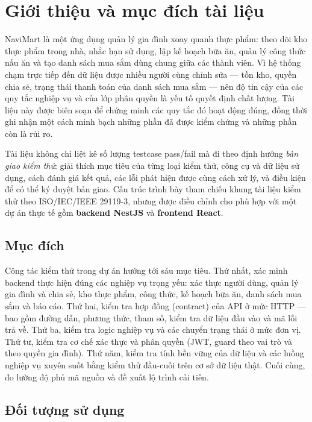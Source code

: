 \documentclass[12pt,a4paper]{article}
\begin{document}
\tableofcontents
\newpage

\section{Giới thiệu và mục đích tài liệu}

NaviMart là một ứng dụng quản lý gia đình xoay quanh thực phẩm: theo dõi kho thực phẩm trong nhà, nhắc hạn
sử dụng, lập kế hoạch bữa ăn, quản lý công thức nấu ăn và tạo danh sách mua sắm dùng chung giữa các thành
viên. Vì hệ thống chạm trực tiếp đến dữ liệu được nhiều người cùng chỉnh sửa --- tồn kho, quyền chia sẻ,
trạng thái thanh toán của danh sách mua sắm --- nên độ tin cậy của các quy tắc nghiệp vụ và của lớp phân
quyền là yếu tố quyết định chất lượng. Tài liệu này được biên soạn để chứng minh các quy tắc đó hoạt động
đúng, đồng thời ghi nhận một cách minh bạch những phần đã được kiểm chứng và những phần còn là rủi ro.

Tài liệu không chỉ liệt kê số lượng testcase pass/fail mà đi theo định hướng \emph{bàn giao kiểm thử}: giải
thích mục tiêu của từng loại kiểm thử, công cụ và dữ liệu sử dụng, cách đánh giá kết quả, các lỗi phát hiện
được cùng cách xử lý, và điều kiện để có thể ký duyệt bản giao. Cấu trúc trình bày tham chiếu khung tài liệu
kiểm thử theo ISO/IEC/IEEE 29119-3, nhưng được điều chỉnh cho phù hợp với một dự án thực tế gồm
\textbf{backend NestJS} và \textbf{frontend React}.

\subsection{Mục đích}

Công tác kiểm thử trong dự án hướng tới sáu mục tiêu. Thứ nhất, xác minh backend thực hiện đúng các nghiệp
vụ trọng yếu: xác thực người dùng, quản lý gia đình và chia sẻ, kho thực phẩm, công thức, kế hoạch bữa ăn,
danh sách mua sắm và báo cáo. Thứ hai, kiểm tra hợp đồng (contract) của API ở mức HTTP --- bao gồm đường
dẫn, phương thức, tham số, kiểm tra dữ liệu đầu vào và mã lỗi trả về. Thứ ba, kiểm tra logic nghiệp vụ và
các chuyển trạng thái ở mức đơn vị. Thứ tư, kiểm tra cơ chế xác thực và phân quyền (JWT, guard theo vai trò
và theo quyền gia đình). Thứ năm, kiểm tra tính bền vững của dữ liệu và các luồng nghiệp vụ xuyên suốt bằng
kiểm thử đầu-cuối trên cơ sở dữ liệu thật. Cuối cùng, đo lường độ phủ mã nguồn và đề xuất lộ trình cải tiến.

\subsection{Đối tượng sử dụng}
\end{document}
